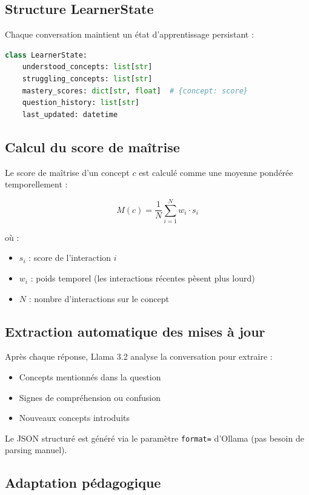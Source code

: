 \documentclass[12pt,a4paper]{article}
\begin{document}
\subsection{Structure LearnerState}

Chaque conversation maintient un état d'apprentissage persistant :

\begin{lstlisting}[language=Python]
class LearnerState:
    understood_concepts: list[str]
    struggling_concepts: list[str]
    mastery_scores: dict[str, float]  # {concept: score}
    question_history: list[str]
    last_updated: datetime
\end{lstlisting}

\subsection{Calcul du score de maîtrise}

Le score de maîtrise d'un concept $c$ est calculé comme une moyenne pondérée temporellement :

\[
M(c) = \frac{1}{N}\sum_{i=1}^{N} w_i \cdot s_i
\]

où :
\begin{itemize}
    \item $s_i$ : score de l'interaction $i$
    \item $w_i$ : poids temporel (les interactions récentes pèsent plus lourd)
    \item $N$ : nombre d'interactions sur le concept
\end{itemize}

\subsection{Extraction automatique des mises à jour}

Après chaque réponse, Llama 3.2 analyse la conversation pour extraire :
\begin{itemize}
    \item Concepts mentionnés dans la question
    \item Signes de compréhension ou confusion
    \item Nouveaux concepts introduits
\end{itemize}

Le JSON structuré est généré via le paramètre \texttt{format=} d'Ollama (pas besoin de parsing manuel).

\subsection{Adaptation pédagogique}
\end{document}
